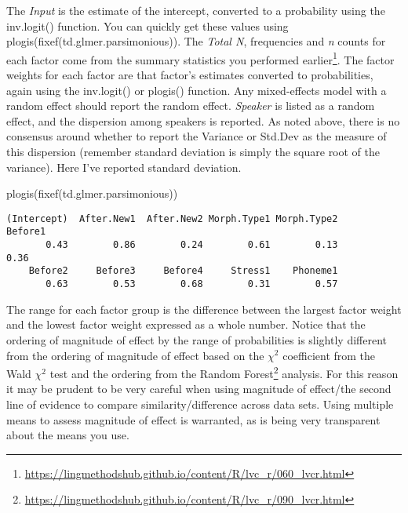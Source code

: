 \documentclass[
  10pt,
  letterpaper]{article}
\newenvironment{Shaded}{\begin{snugshade}}{\end{snugshade}}
\newcommand{\FunctionTok}[1]{\textcolor[rgb]{0.28,0.35,0.67}{#1}}
\newcommand{\NormalTok}[1]{\textcolor[rgb]{0.00,0.23,0.31}{#1}}
\renewcommand\texttt[1]{{\ttfamily\color{BrickRed}#1}}
\DeclareRobustCommand{\href}[2]{#2\footnote{\url{#1}}}
\begin{document}
The \emph{Input} is the estimate of the intercept, converted to a
probability using the \texttt{inv.logit()} function. You can quickly get
these values using \texttt{plogis(fixef(td.glmer.parsimonious))}. The
\emph{Total N}, frequencies and \emph{n} counts for each factor come
from the summary statistics you
\href{https://lingmethodshub.github.io/content/R/lvc_r/060_lvcr.html}{performed
earlier}. The factor weights for each factor are that factor's estimates
converted to probabilities, again using the \texttt{inv.logit()} or
\texttt{plogis()} function. Any mixed-effects model with a random effect
should report the random effect. \emph{Speaker} is listed as a random
effect, and the dispersion among speakers is reported. As noted above,
there is no consensus around whether to report the \texttt{Variance} or
\texttt{Std.Dev} as the measure of this dispersion (remember standard
deviation is simply the square root of the variance). Here I've reported
standard deviation.

\begin{Shaded}
\begin{Highlighting}[]
\FunctionTok{plogis}\NormalTok{(}\FunctionTok{fixef}\NormalTok{(td.glmer.parsimonious))}
\end{Highlighting}
\end{Shaded}

\begin{verbatim}
(Intercept)  After.New1  After.New2 Morph.Type1 Morph.Type2     Before1 
       0.43        0.86        0.24        0.61        0.13        0.36 
    Before2     Before3     Before4     Stress1    Phoneme1 
       0.63        0.53        0.68        0.31        0.57 
\end{verbatim}

The range for each factor group is the difference between the largest
factor weight and the lowest factor weight expressed as a whole number.
Notice that the ordering of magnitude of effect by the range of
probabilities is slightly different from the ordering of magnitude of
effect based on the \(\chi^2\) coefficient from the Wald \(\chi^2\) test
and the ordering from the
\href{https://lingmethodshub.github.io/content/R/lvc_r/090_lvcr.html}{Random
Forest} analysis. For this reason it may be prudent to be very careful
when using magnitude of effect/the second line of evidence to compare
similarity/difference across data sets. Using multiple means to assess
magnitude of effect is warranted, as is being very transparent about the
means you use.
\end{document}
